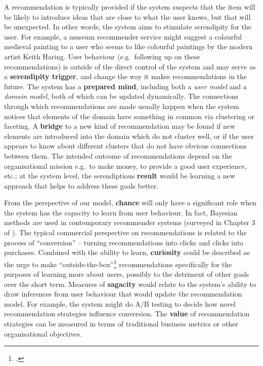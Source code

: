 A recommendation is typically provided if the system suspects that the
item will be likely to introduce ideas that are close to what the user
knows, but that will be unexpected.  In other words, the system aims
to stimulate serendipity for the user. For example, a museum
recommender service might suggest a colourful medieval painting to a
user who seems to like colourful paintings by the modern artist Keith
Haring.  User behaviour (e.g.~following up on these recommendations)
is outside of the direct control of the system and may serve as a
\textbf{serendipity trigger}, and change the way it makes
recommendations in the future.  The system has a \textbf{prepared
  mind}, including both a \emph{user model} and a \emph{domain model},
both of which can be updated dynamically.  The connections through
which recommendations are made usually happen when the system notices
that elements of the domain have something in common via clustering or
faceting.  A \textbf{bridge} to a new kind of recommendation may be
found if new elements are introduced into the domain which do not
cluster well, or if the user appears to know about different clusters
that do not have obvious connections between them.  The intended
outcome of recommendations depend on the organisational mission
e.g.~to make money, to provide a good user experience, etc.; at the
system level, the serendiptious \textbf{result} would be learning a
new approach that helps to address these goals better.

From the perspective of our model, \textbf{chance} will only have a
significant role when the system has the capacity to learn from user
behaviour.  In fact, Bayesian methods are used in contemporary
recommender systems (surveyed in Chapter 3 of
).  The typical commercial perspective on
recommendations is related to the process of ``conversion'' -- turning
recommendations into clicks and clicks into purchases.  Combined with
the ability to learn, \textbf{curiosity} could be described as the
urge to make ``outside-the-box''\footnote{.}
recommendations specifically for the purposes of learning more about
users, possibly to the detriment of other goals over the short term.
Measures of \textbf{sagacity} would relate to the system's ability to
draw inferences from user behaviour that would update the
recommendation model.  For example, the system might do A/B testing to
decide how novel recommendation strategies influence conversion.  The
\textbf{value} of recommendation strategies can be measured in terms
of traditional business metrics or other organisational objectives.

